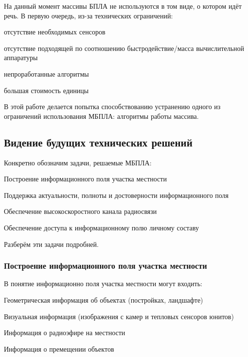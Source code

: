 На данный момент массивы БПЛА не используются в том виде,
о котором идёт речь. В первую очередь, из-за технических
ограничений:
\begin{mintemize}
    \item отсутствие необходимых сенсоров
    \item отсутствие подходящей по соотношению быстродействие/масса
        вычислительной аппаратуры
    \item непроработанные алгоритмы
    \item большая стоимость единицы
\end{mintemize}

В этой работе делается попытка способствованию
устранению одного из ограничений использования МБПЛА:
алгоритмы работы массива.

\subsection{Видение будущих технических решений}

Конкретно обозначим задачи, решаемые МБПЛА:

\begin{mintemize}
\item Построение информационного поля участка местности
\item Поддержка актуальности, полноты и достоверности информационного поля
\item Обеспечение высокоскоростного канала радиосвязи
\item Обеспечение доступа к информационному полю личному составу
\end{mintemize}

Разберём эти задачи подробней.

\subsubsection{Построение информационного поля участка местности}

В понятие информационно поля участка местности могут входить:

\begin{mintemize}
\item Геометрическая информация об объектах (постройках, ландшафте)
\item Визуальная информация (изображения с камер и тепловых сенсоров юнитов)
\item Информация о радиоэфире на местности
\item Информация о премещении объектов
\end{mintemize}

